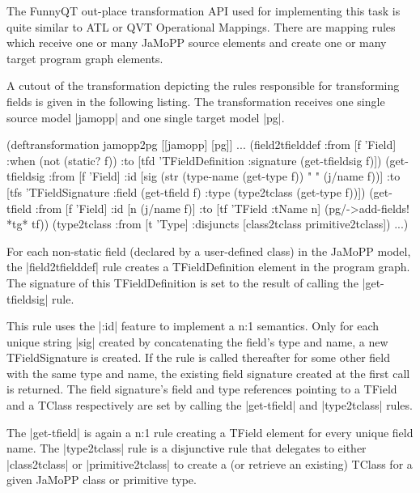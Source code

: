 \documentclass[submission]{eptcs}
\newcommand{\code}{\clojureinline}
\begin{document}
The FunnyQT out-place transformation API used for implementing this task is
quite similar to ATL or QVT Operational Mappings.  There are mapping rules
which receive one or many JaMoPP source elements and create one or many target
program graph elements.

A cutout of the transformation depicting the rules responsible for transforming
fields is given in the following listing.  The transformation receives one
single source model \code|jamopp| and one single target model \code|pg|.

\begin{clojurecode}
(deftransformation jamopp2pg [[jamopp] [pg]]
  ...
  (field2tfielddef
   :from [f 'Field]
   :when (not (static? f))
   :to   [tfd 'TFieldDefinition {:signature (get-tfieldsig f)}])
  (get-tfieldsig
   :from [f 'Field]
   :id   [sig (str (type-name (get-type f)) " " (j/name f))]
   :to   [tfs 'TFieldSignature {:field (get-tfield f)
                                :type  (type2tclass (get-type f))}])
  (get-tfield
   :from [f 'Field]
   :id   [n (j/name f)]
   :to   [tf 'TField {:tName n}]
   (pg/->add-fields! *tg* tf))
  (type2tclass
   :from [t 'Type]
   :disjuncts [class2tclass primitive2tclass])
  ...)
\end{clojurecode}

For each non-static field (declared by a user-defined class) in the JaMoPP
model, the \code|field2tfielddef| rule creates a \textsf{TFieldDefinition}
element in the program graph.  The signature of this \textsf{TFieldDefinition}
is set to the result of calling the \code|get-tfieldsig| rule.

This rule uses the \code|:id| feature to implement a n:1 semantics.  Only for
each unique string \code|sig| created by concatenating the field's type and
name, a new \textsf{TFieldSignature} is created.  If the rule is called
thereafter for some other field with the same type and name, the existing field
signature created at the first call is returned.  The field signature's
\textsf{field} and \textsf{type} references pointing to a \textsf{TField} and a
\textsf{TClass} respectively are set by calling the \code|get-tfield| and
\code|type2tclass| rules.

The \code|get-tfield| is again a n:1 rule creating a \textsf{TField} element
for every unique field name.  The \code|type2tclass| rule is a disjunctive rule
that delegates to either \code|class2tclass| or \code|primitive2tclass| to
create a (or retrieve an existing) \textsf{TClass} for a given JaMoPP class or
primitive type.
\end{document}
